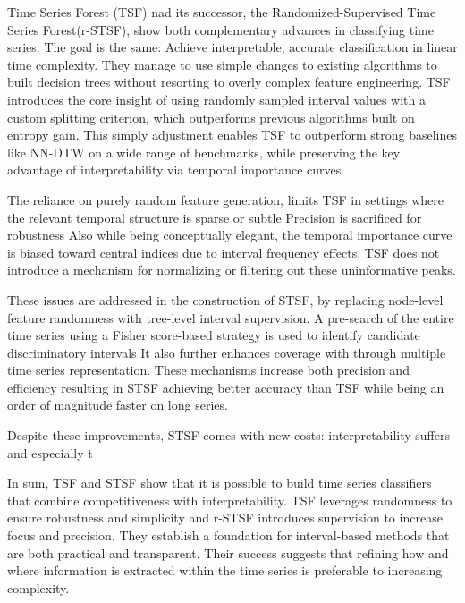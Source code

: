 Time Series Forest (TSF) nad its successor, the Randomized-Supervised
Time Series Forest(r-STSF), show both complementary advances in classifying time series.
The goal is the same: Achieve interpretable, accurate classification in linear time complexity.
They manage to use simple changes to existing algorithms to built decision trees without resorting to overly
complex feature engineering. TSF introduces the core insight of using 
randomly sampled interval values with a custom splitting criterion, which outperforms
previous algorithms built on entropy gain. This simply adjustment enables TSF to 
outperform strong baselines like NN-DTW on a wide range of benchmarks, while preserving the 
key advantage of interpretability via temporal importance curves.

The reliance on purely random feature generation, limits TSF in settings where the 
relevant temporal structure is sparse or subtle %
Precision is sacrificed for robustness %
Also while being conceptually elegant, the temporal importance curve 
is biased toward central indices due to interval frequency effects. TSF does not introduce 
a mechanism for normalizing or filtering out these uninformative peaks.

These issues are addressed in the construction of STSF, by replacing node-level feature randomness
with tree-level interval supervision. A pre-search of the entire time series using a Fisher score-based strategy
is used to identify candidate discriminatory intervals
It also further enhances coverage with 
through multiple time series representation.
These mechanisms increase both precision and efficiency resulting in STSF achieving better accuracy than TSF while being an 
order of magnitude faster on long series. %

Despite these improvements, STSF comes with new costs: 
interpretability suffers and especially t

In sum, TSF and STSF show that it is possible to build time series classifiers that combine
competitiveness with interpretability. TSF leverages randomness to ensure robustness and simplicity and 
r-STSF introduces supervision to increase focus and precision. They establish a foundation for interval-based 
methods that are both practical and transparent. Their success suggests that refining how and where
information is extracted within the time series is preferable to increasing
complexity.